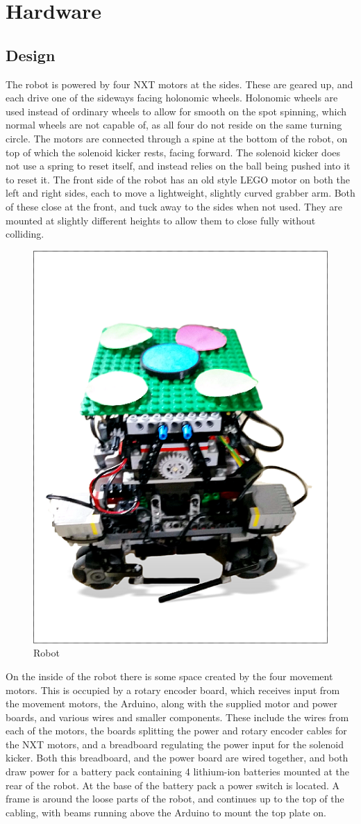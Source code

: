 \section{Hardware}

\subsection{Design}

The robot is powered by four NXT motors at the sides. These are geared up, and
each drive one of the sideways facing holonomic wheels. Holonomic wheels are
used instead of ordinary wheels to allow for smooth on the spot spinning, which
normal wheels are not capable of, as all four do not reside on the same turning
circle. The motors are connected through a spine at the bottom of the robot,
on top of which the solenoid kicker rests, facing forward. The solenoid kicker
does not use a spring to reset itself, and instead relies on the ball being
pushed into it to reset it. The front side of the robot has an old style LEGO
motor on both the left and right sides, each to move a lightweight, slightly
curved grabber arm. Both of these close at the front, and tuck away to the
sides when not used. They are mounted at slightly different heights to allow
them to close fully without colliding.

\begin{figure}[H]
	\begin{center}
    \includegraphics[width=0.35\linewidth]{res/robot.png}
    \caption{Robot}
    \label{fig:goalsandactionsstructure}
	\end{center}
\end{figure}

On the inside of the robot there is some space created by the four movement
motors. This is occupied by a rotary encoder board, which receives input from
the movement motors, the Arduino, along with the supplied motor and power
boards, and various wires and smaller components. These include the wires from
each of the motors, the boards splitting the power and rotary encoder cables
for the NXT motors, and a breadboard regulating the power input for the
solenoid kicker. Both this breadboard, and the power board are wired together,
and both draw power for a battery pack containing 4 lithium-ion batteries
mounted at the rear of the robot. At the base of the battery pack a power
switch is located. A frame is around the loose parts of the robot, and
continues up to the top of the cabling, with beams running above the Arduino to
mount the top plate on.

